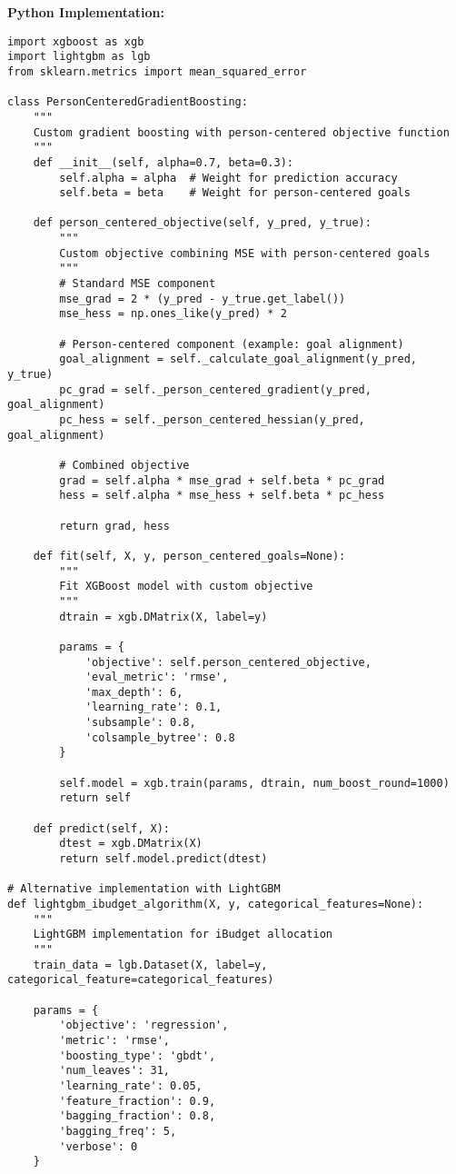 \textbf{Python Implementation:}
\begin{lstlisting}
import xgboost as xgb
import lightgbm as lgb
from sklearn.metrics import mean_squared_error

class PersonCenteredGradientBoosting:
    """
    Custom gradient boosting with person-centered objective function
    """
    def __init__(self, alpha=0.7, beta=0.3):
        self.alpha = alpha  # Weight for prediction accuracy
        self.beta = beta    # Weight for person-centered goals
        
    def person_centered_objective(self, y_pred, y_true):
        """
        Custom objective combining MSE with person-centered goals
        """
        # Standard MSE component
        mse_grad = 2 * (y_pred - y_true.get_label())
        mse_hess = np.ones_like(y_pred) * 2
        
        # Person-centered component (example: goal alignment)
        goal_alignment = self._calculate_goal_alignment(y_pred, y_true)
        pc_grad = self._person_centered_gradient(y_pred, goal_alignment)
        pc_hess = self._person_centered_hessian(y_pred, goal_alignment)
        
        # Combined objective
        grad = self.alpha * mse_grad + self.beta * pc_grad
        hess = self.alpha * mse_hess + self.beta * pc_hess
        
        return grad, hess
    
    def fit(self, X, y, person_centered_goals=None):
        """
        Fit XGBoost model with custom objective
        """
        dtrain = xgb.DMatrix(X, label=y)
        
        params = {
            'objective': self.person_centered_objective,
            'eval_metric': 'rmse',
            'max_depth': 6,
            'learning_rate': 0.1,
            'subsample': 0.8,
            'colsample_bytree': 0.8
        }
        
        self.model = xgb.train(params, dtrain, num_boost_round=1000)
        return self
    
    def predict(self, X):
        dtest = xgb.DMatrix(X)
        return self.model.predict(dtest)

# Alternative implementation with LightGBM
def lightgbm_ibudget_algorithm(X, y, categorical_features=None):
    """
    LightGBM implementation for iBudget allocation
    """
    train_data = lgb.Dataset(X, label=y, categorical_feature=categorical_features)
    
    params = {
        'objective': 'regression',
        'metric': 'rmse',
        'boosting_type': 'gbdt',
        'num_leaves': 31,
        'learning_rate': 0.05,
        'feature_fraction': 0.9,
        'bagging_fraction': 0.8,
        'bagging_freq': 5,
        'verbose': 0
    }
    

\end{lstlisting}

